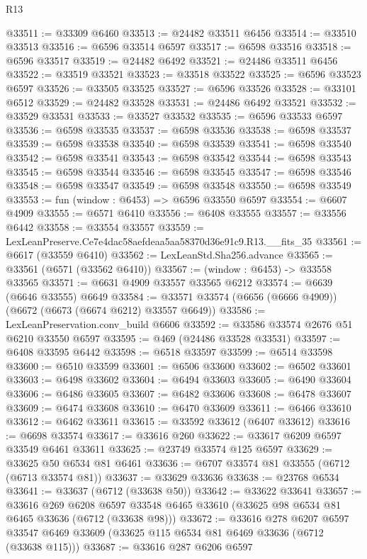 \begin{lexlean}{R13}
\begin{coremodule}
@33511 := @33309 @6460
@33513 := @24482 @33511 @6456
@33514 := @33510 @33513
@33516 := @6596 @33514 @6597
@33517 := @6598 @33516
@33518 := @6596 @33517
@33519 := @24482 @6492
@33521 := @24486 @33511 @6456
@33522 := @33519 @33521
@33523 := @33518 @33522
@33525 := @6596 @33523 @6597
@33526 := @33505 @33525
@33527 := @6596 @33526
@33528 := @33101 @6512
@33529 := @24482 @33528
@33531 := @24486 @6492 @33521
@33532 := @33529 @33531
@33533 := @33527 @33532
@33535 := @6596 @33533 @6597
@33536 := @6598 @33535
@33537 := @6598 @33536
@33538 := @6598 @33537
@33539 := @6598 @33538
@33540 := @6598 @33539
@33541 := @6598 @33540
@33542 := @6598 @33541
@33543 := @6598 @33542
@33544 := @6598 @33543
@33545 := @6598 @33544
@33546 := @6598 @33545
@33547 := @6598 @33546
@33548 := @6598 @33547
@33549 := @6598 @33548
@33550 := @6598 @33549
@33553 := fun (window : @6453) => @6596 @33550 @6597
@33554 := @6607 @4909
@33555 := @6571 @6410
@33556 := @6408 @33555
@33557 := @33556 @6442
@33558 := @33554 @33557
@33559 := LexLeanPreserve.Ce7e4dac58aefdeaa5aa58370d36e91c9.R13.__fits_35
@33561 := @6617 (@33559 @6410)
@33562 := LexLeanStd.Sha256.advance
@33565 := @33561 (@6571 (@33562 @6410))
@33567 := (window : @6453) -> @33558 @33565
@33571 := @6631 @4909 @33557 @33565 @6212
@33574 := @6639 (@6646 @33555) @6649
@33584 := @33571 @33574 (@6656 (@6666 @4909)) (@6672 (@6673 (@6674 @6212) @33557 @6649))
@33586 := LexLeanPreservation.conv_build @6606
@33592 := @33586 @33574 @2676 @51 @6210 @33550 @6597
@33595 := @469 (@24486 @33528 @33531)
@33597 := @6408 @33595 @6442
@33598 := @6518 @33597
@33599 := @6514 @33598
@33600 := @6510 @33599
@33601 := @6506 @33600
@33602 := @6502 @33601
@33603 := @6498 @33602
@33604 := @6494 @33603
@33605 := @6490 @33604
@33606 := @6486 @33605
@33607 := @6482 @33606
@33608 := @6478 @33607
@33609 := @6474 @33608
@33610 := @6470 @33609
@33611 := @6466 @33610
@33612 := @6462 @33611
@33615 := @33592 @33612 (@6407 @33612)
@33616 := @6698 @33574
@33617 := @33616 @260
@33622 := @33617 @6209 @6597 @33549 @6461 @33611
@33625 := @23749 @33574 @125 @6597
@33629 := @33625 @50 @6534 @81 @6461
@33636 := @6707 @33574 @81 @33555 (@6712 (@6713 @33574 @81))
@33637 := @33629 @33636
@33638 := @23768 @6534
@33641 := @33637 (@6712 (@33638 @50))
@33642 := @33622 @33641
@33657 := @33616
    @269
    @6208
    @6597
    @33548
    @6465
    @33610
    (@33625 @98 @6534 @81 @6465 @33636 (@6712 (@33638 @98)))
@33672 := @33616
    @278
    @6207
    @6597
    @33547
    @6469
    @33609
    (@33625 @115 @6534 @81 @6469 @33636 (@6712 (@33638 @115)))
@33687 := @33616
    @287
    @6206
    @6597

\end{coremodule}
\end{lexlean}
